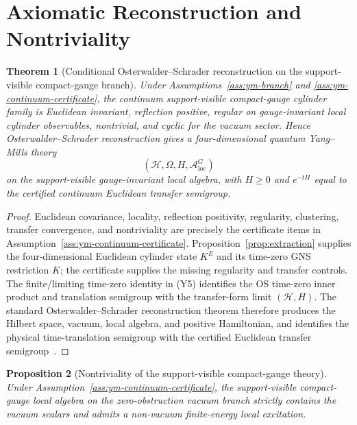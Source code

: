 \documentclass[11pt]{article}
\numberwithin{equation}{section}
\newtheorem{theorem}{Theorem}[section]
\newtheorem{proposition}[theorem]{Proposition}
\theoremstyle{remark}
\newcommand{\A}{\mathcal A}
\newcommand{\Hcal}{\mathcal H}
\begin{document}
\section{Axiomatic Reconstruction and Nontriviality}

\begin{theorem}[Conditional Osterwalder--Schrader reconstruction on the support-visible compact-gauge branch]
\label{thm:os}
Under Assumptions~\ref{ass:ym-branch} and \ref{ass:ym-continuum-certificate}, the continuum
support-visible compact-gauge cylinder family is Euclidean invariant, reflection positive,
regular on gauge-invariant local cylinder observables, nontrivial, and cyclic for the vacuum
sector. Hence Osterwalder--Schrader reconstruction gives a four-dimensional quantum Yang--Mills
theory
\[
(\Hcal,\Omega,H,\A_{\mathrm{loc}}^{G})
\]
on the support-visible gauge-invariant local algebra, with \(H\ge0\) and
\(e^{-tH}\) equal to the certified continuum Euclidean transfer semigroup.
\end{theorem}

\begin{proof}
Euclidean covariance, locality, reflection positivity, regularity, clustering, transfer
convergence, and nontriviality are precisely the certificate items in
Assumption~\ref{ass:ym-continuum-certificate}. Proposition~\ref{prop:extraction} supplies the
four-dimensional Euclidean cylinder state \(K^E\) and its time-zero GNS restriction \(K\); the
certificate supplies the missing regularity and transfer controls. The finite/limiting time-zero
identity in (Y5) identifies the OS time-zero inner product and translation semigroup with the
transfer-form limit \((\Hcal,H)\). The standard Osterwalder--Schrader reconstruction theorem
therefore produces the Hilbert space, vacuum, local algebra, and positive Hamiltonian, and
identifies the physical time-translation semigroup with the certified Euclidean transfer
semigroup~\cite{osterwalder-schrader1,osterwalder-schrader2}.
\end{proof}

\begin{proposition}[Nontriviality of the support-visible compact-gauge theory]
\label{prop:nontriviality}
Under Assumption~\ref{ass:ym-continuum-certificate},
the support-visible compact-gauge local algebra on the zero-obstruction vacuum branch strictly
contains the vacuum scalars and admits a non-vacuum finite-energy local excitation.
\end{proposition}
\end{document}
